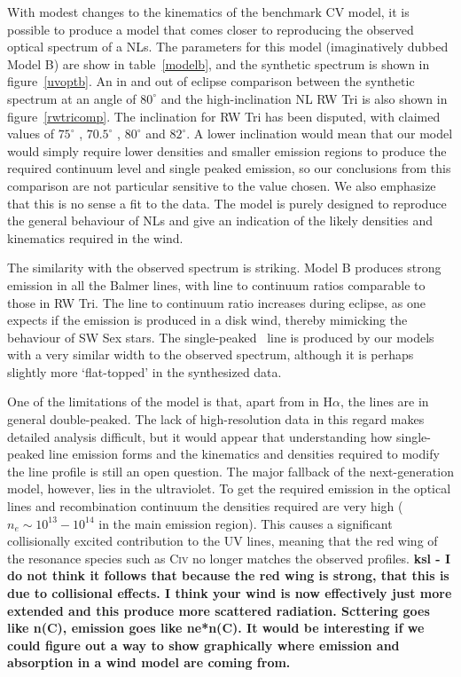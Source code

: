 \documentclass[preprint, a4paper, 11pt]{aastex}
\begin{document}
{With modest changes to the kinematics of the benchmark CV model,
it is possible to produce a model
that comes closer to reproducing the observed optical spectrum
of a NLs. The parameters for this model (imaginatively dubbed Model B)
are show in table~\ref{modelb}, and the synthetic spectrum
is shown in figure~\ref{uvoptb}. An in and out of eclipse comparison 
between the synthetic spectrum
at an angle of $80^\circ$ and the high-inclination NL RW Tri 
is also shown in figure~\ref{rwtricomp}. The inclination
for RW Tri has been disputed, with claimed values of $75^\circ$ \citep{groot2004},
$70.5^\circ$ \citep{smak1995}, $80^\circ$ \citep{longmore1981} and 
$82^\circ$\citep{frankking1981}. A lower inclination
would mean that our model would simply require lower densities 
and smaller emission regions to produce the required continuum level
and single peaked emission, so our conclusions from this comparison are
not particular sensitive to the value chosen.
We also emphasize that this is no sense a fit to the data. The model
is purely designed to reproduce the general behaviour of NLs
and give an indication of the likely densities and kinematics 
required in the wind.

The similarity with the observed spectrum is striking. 
Model B produces strong emission in all the Balmer lines, 
with line to continuum ratios
comparable to those in RW Tri. 
The line to continuum ratio increases during eclipse,
as one expects if the emission is produced in a disk wind, 
thereby mimicking the behaviour of SW Sex stars.
The single-peaked \ha\ line is produced by our models with a 
very similar width to the observed spectrum, although it is perhaps slightly more
`flat-topped' in the synthesized data.

One of the limitations of the model is that, apart 
from in H$\alpha$, the lines are in general double-peaked. 
The lack of high-resolution data in this regard makes detailed analysis difficult,
but it would appear that understanding how single-peaked 
line emission forms and the kinematics and densities required to
modify the line profile is still an open question. 
The major fallback of the next-generation model, however, lies
in the ultraviolet. To get the required emission in the optical lines
and recombination continuum the densities required are very high 
($n_e\sim10^{13}-10^{14}$ in the main emission region).
This causes a significant collisionally excited contribution
to the UV lines, meaning that the red wing of the 
resonance species such as C\textsc{iv} no longer matches the
observed profiles. {\bf ksl - I do not think it follows that because the red wing is strong, that this is due to collisional effects.  I think your wind is now effectively just more extended and this produce more scattered radiation. Scttering goes like n(C), emission goes like ne*n(C).  It would be interesting if we could figure out a way to show graphically where emission and absorption in a wind model are coming from.}




}
\end{document}
